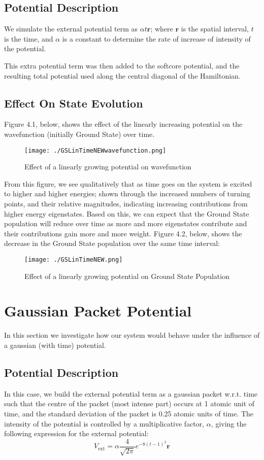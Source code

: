 \subsection{Potential Description}
We simulate the external potential term as $\alpha t \mathbf{r}$; where $\mathbf{r}$ is the spatial interval, $t$ is the time, and $\alpha$ is a constant to determine the rate of increase of intensity of the potential.

This extra potential term was then added to the softcore potential, and the resulting total potential used along the central diagonal of the Hamiltonian.

\subsection{Effect On State Evolution}
Figure 4.1, below, shows the effect of the linearly increasing potential on the wavefunction (initially Ground State) over time.
\begin{figure}[H]
          \texttt{[image: ./GSLinTimeNEWwavefunction.png]}
          \centering
          \caption{Effect of a linearly growing potential on wavefunction}
\end{figure}
From this figure, we see qualitatively that as time goes on the system is excited to higher and higher energies; shown through the increased numbers of turning points, and their relative magnitudes, indicating increasing contributions from higher energy eigenstates. Based on this, we can expect that the Ground State population will reduce over time as more and more eigenstates contribute and their contributions gain more and more weight. Figure 4.2, below, shows the decrease in the Ground State population over the same time interval:

\begin{figure}[H]
          \texttt{[image: ./GSLinTimeNEW.png]}
          \centering
          \caption{Effect of a linearly growing potential on Ground State Population}
\end{figure}

\section{Gaussian Packet Potential}
In this section we investigate how our system would behave under the influence of a gaussian (with time) potential.

\subsection{Potential Description}
In this case, we build the external potential term as a gaussian packet w.r.t. time such that the centre of the packet (most intense part) occurs at 1 atomic unit of time, and the standard deviation of the packet is 0.25 atomic units of time. The intensity of the potential is controlled by a multiplicative factor, $\alpha$, giving the following expression for the external potential: 
$$
V_{\text{ext}} = \alpha \frac{4}{\sqrt{2\pi}}e^{-8\left(t-1\right)^{2}}\mathbf{r}
$$

